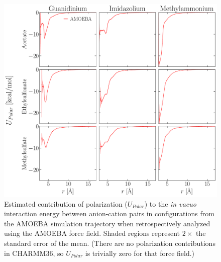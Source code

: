 \documentclass[journal=jacsat,articletitle=true,manuscript=suppinfo,layout=onecolumn]{achemso}
\begin{document}
    \begin{figure}[H]
    \begin{center}
        \includegraphics[width=1\columnwidth]{images/energy_conts_polar.pdf}
        \caption{Estimated contribution of polarization ($U_{Polar}$) to the \emph{in vacuo} interaction energy between anion-cation pairs in configurations from the AMOEBA simulation trajectory when retrospectively analyzed using the AMOEBA force field. Shaded regions represent $2\times$ the standard error of the mean. (There are no polarization contributions in CHARMM36, so $U_{Polar}$ is trivially zero for that force field.)}
        \label{fig:energy_conts_polar}
    \end{center}
    \end{figure}
\end{document}
